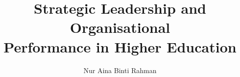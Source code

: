 
\title{Strategic Leadership and Organisational\\ Performance in Higher Education}

\author{Nur Aina Binti Rahman}

\address{Kuala Lumpur, Malaysia}


